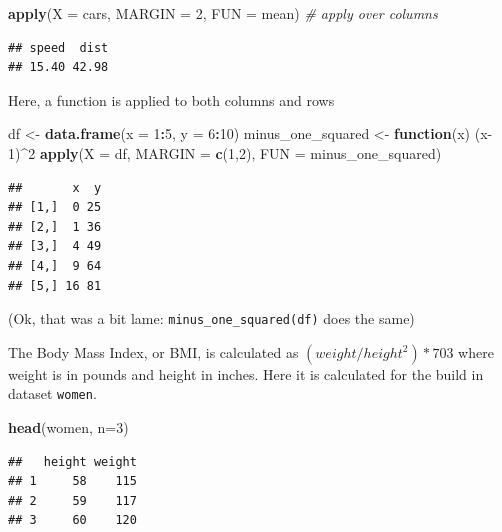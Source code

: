 \documentclass[]{book}
\newenvironment{Shaded}{\begin{snugshade}}{\end{snugshade}}
\newcommand{\CommentTok}[1]{\textcolor[rgb]{0.56,0.35,0.01}{\textit{#1}}}
\newcommand{\ControlFlowTok}[1]{\textcolor[rgb]{0.13,0.29,0.53}{\textbf{#1}}}
\newcommand{\DataTypeTok}[1]{\textcolor[rgb]{0.13,0.29,0.53}{#1}}
\newcommand{\DecValTok}[1]{\textcolor[rgb]{0.00,0.00,0.81}{#1}}
\newcommand{\KeywordTok}[1]{\textcolor[rgb]{0.13,0.29,0.53}{\textbf{#1}}}
\newcommand{\NormalTok}[1]{#1}
\newcommand{\OperatorTok}[1]{\textcolor[rgb]{0.81,0.36,0.00}{\textbf{#1}}}
\newcommand{\StringTok}[1]{\textcolor[rgb]{0.31,0.60,0.02}{#1}}
\begin{document}
\begin{Shaded}
\begin{Highlighting}[]
\KeywordTok{apply}\NormalTok{(}\DataTypeTok{X =}\NormalTok{ cars, }\DataTypeTok{MARGIN =} \DecValTok{2}\NormalTok{, }\DataTypeTok{FUN =}\NormalTok{ mean) }\CommentTok{# apply over columns}
\end{Highlighting}
\end{Shaded}

\begin{verbatim}
## speed  dist 
## 15.40 42.98
\end{verbatim}

Here, a function is applied to both columns and rows

\begin{Shaded}
\begin{Highlighting}[]
\NormalTok{df <-}\StringTok{ }\KeywordTok{data.frame}\NormalTok{(}\DataTypeTok{x =} \DecValTok{1}\OperatorTok{:}\DecValTok{5}\NormalTok{, }\DataTypeTok{y =} \DecValTok{6}\OperatorTok{:}\DecValTok{10}\NormalTok{)}
\NormalTok{minus_one_squared <-}\StringTok{ }\ControlFlowTok{function}\NormalTok{(x) (x}\DecValTok{-1}\NormalTok{)}\OperatorTok{^}\DecValTok{2}
\KeywordTok{apply}\NormalTok{(}\DataTypeTok{X =}\NormalTok{ df, }\DataTypeTok{MARGIN =} \KeywordTok{c}\NormalTok{(}\DecValTok{1}\NormalTok{,}\DecValTok{2}\NormalTok{), }\DataTypeTok{FUN =}\NormalTok{ minus_one_squared)}
\end{Highlighting}
\end{Shaded}

\begin{verbatim}
##       x  y
## [1,]  0 25
## [2,]  1 36
## [3,]  4 49
## [4,]  9 64
## [5,] 16 81
\end{verbatim}

(Ok, that was a bit lame: \texttt{minus\_one\_squared(df)} does the same)

The Body Mass Index, or BMI, is calculated as \((weight / height ^ 2) * 703\) where weight is in pounds and height in inches. Here it is calculated for the build in dataset \texttt{women}.

\begin{Shaded}
\begin{Highlighting}[]
\KeywordTok{head}\NormalTok{(women, }\DataTypeTok{n=}\DecValTok{3}\NormalTok{)}
\end{Highlighting}
\end{Shaded}

\begin{verbatim}
##   height weight
## 1     58    115
## 2     59    117
## 3     60    120
\end{verbatim}
\end{document}
